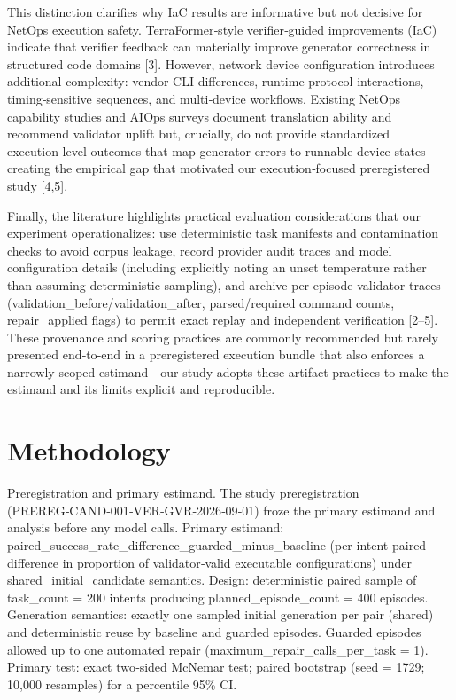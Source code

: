 \documentclass[conference]{IEEEtran}
\begin{document}
This distinction clarifies why IaC results are informative but not decisive for NetOps execution safety. TerraFormer‑style verifier‑guided improvements (IaC) indicate that verifier feedback can materially improve generator correctness in structured code domains [3]. However, network device configuration introduces additional complexity: vendor CLI differences, runtime protocol interactions, timing‑sensitive sequences, and multi‑device workflows. Existing NetOps capability studies and AIOps surveys document translation ability and recommend validator uplift but, crucially, do not provide standardized execution‑level outcomes that map generator errors to runnable device states---creating the empirical gap that motivated our execution‑focused preregistered study [4,5].

Finally, the literature highlights practical evaluation considerations that our experiment operationalizes: use deterministic task manifests and contamination checks to avoid corpus leakage, record provider audit traces and model configuration details (including explicitly noting an unset temperature rather than assuming deterministic sampling), and archive per‑episode validator traces (validation\_before/validation\_after, parsed/required command counts, repair\_applied flags) to permit exact replay and independent verification [2--5]. These provenance and scoring practices are commonly recommended but rarely presented end‑to‑end in a preregistered execution bundle that also enforces a narrowly scoped estimand---our study adopts these artifact practices to make the estimand and its limits explicit and reproducible.

\section{Methodology}
Preregistration and primary estimand. The study preregistration (PREREG‑CAND‑001‑VER‑GVR‑2026‑09‑01) froze the primary estimand and analysis before any model calls. Primary estimand: paired\_success\_rate\_difference\_guarded\_minus\_baseline (per‑intent paired difference in proportion of validator‑valid executable configurations) under shared\_initial\_candidate semantics. Design: deterministic paired sample of task\_count = 200 intents producing planned\_episode\_count = 400 episodes. Generation semantics: exactly one sampled initial generation per pair (shared) and deterministic reuse by baseline and guarded episodes. Guarded episodes allowed up to one automated repair (maximum\_repair\_calls\_per\_task = 1). Primary test: exact two‑sided McNemar test; paired bootstrap (seed = 1729; 10,000 resamples) for a percentile 95\% CI.
\end{document}
